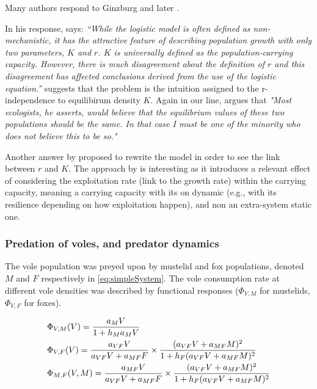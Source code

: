 \documentclass[11pt]{article}
\begin{document}
Many authors respond to Ginzburg \citep{Olson1992, Watkinson1992, Mackenzie1992, Berryman1992} and later \citep{Gabriel2005}.  

In his response, \citet{Olson1992} says: \textit{“While the logistic model is often defined as non-mechanistic, it has the attractive feature of describing population growth with only two parameters, $K$ and $r$. $K$ is universally defined as the population-carrying capacity. However, there is much disagreement about the definition of  $r$ and this disagreement has affected conclusions derived from the use of the logistic equation.”}
%
\citet{Olson1992} suggests that the problem is the intuition assigned to the r-independence to equilibirum density $K$.
%
Again in our line, \citet{Watkinson1992} argues that \textit{"Most ecologists, he asserts, would believe that the equilibrium values of these two populations should be the same. In that case I must be one of the minority who does not believe this to be so."} 

Another answer by \citet{Berryman1992} proposed to rewrite the model in order to see the link between $r$ and $K$. The approach by \citet{Berryman1992} is interesting as it introduces a relevant effect of considering  the exploitation rate (link to the growth rate) within the carrying capacity, meaning a carrying capacity with its on dynamic (e.g., with its resilience depending on how exploitation happen), and non an extra-system static one.

\subsubsection{Predation of voles, and predator dynamics}

The vole population was preyed upon by mustelid and fox populations, denoted $M$ and $F$ respectively in \eqref{eq:simpleSystem}. The vole consumption rate at different vole densities was described by functional responses ($\Phi_{V,M}$ for mustelids, $\Phi_{V,F}$  for foxes).

\begin{equation}
\begin{array}{l l}
\Phi_{V,M}(V) = \dfrac{a_M V}{1 + h_M a_M V} \\[.3cm]
%
\Phi_{V,F}(V) = \dfrac{a_{VF} V}{a_{VF}V + a_{MF}F} \times \dfrac{(a_{VF}V + a_{MF} M)^2}{1 + h_F(a_{VF}V + a_{MF} M)^2}\\[.3cm]
%
\Phi_{M,F}(V,M) = \dfrac{a_{MF}V}{a_{VF}V + a_{MF}F} \times \dfrac{(a_{VF}V + a_{MF}M)^2}{1+h_F(a_{VF}V + a_{MF}M)^2}
\end{array}
\label{eq:functionResponse}
\end{equation}
\end{document}
